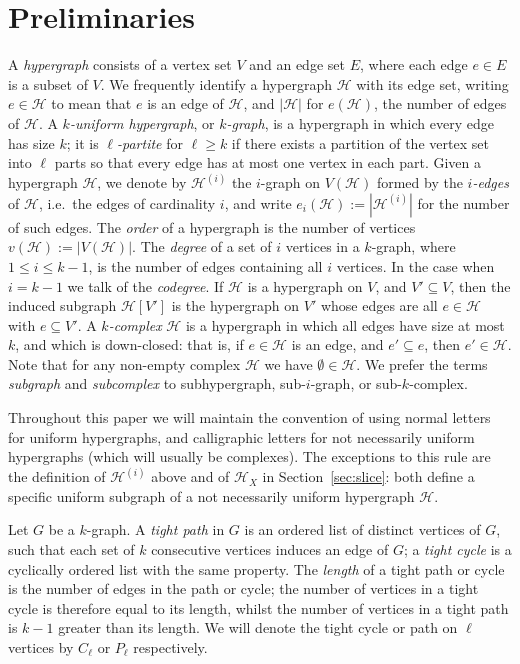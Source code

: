 \documentclass[12pt,a4paper]{amsart}
\let\subset\subseteq
\newcommand{\Hy}{\mathcal{H}}
\begin{document}

\section{Preliminaries}

A \emph{hypergraph} consists of a vertex set $V$ and an edge set $E$, where each edge $e \in E$ is a subset of $V$.  We frequently identify a hypergraph $\Hy$ with
its edge set, writing $e \in \Hy$ to mean that $e$ is an edge of $\Hy$, and
$|\Hy|$ for $e(\Hy)$, the number of edges of $\Hy$.
A \emph{$k$-uniform hypergraph}, or \emph{$k$-graph}, is a hypergraph in which every edge has
size $k$; it is \emph{$\ell$-partite} for $\ell \ge k$ if there exists a partition of the vertex set into $\ell$ parts so that every edge has at most one vertex in each part.
Given a hypergraph $\Hy$, we denote by $\Hy^{(i)}$ the $i$-graph on
$V(\Hy)$ formed by the \emph{$i$-edges} of $\Hy$, i.e.~the edges of cardinality $i$, and write $e_i(\Hy) := |\Hy^{(i)}|$ for the number of such edges. The \emph{order} of a hypergraph is the
number of vertices $v(\Hy) := |V(\Hy)|$. The \emph{degree} of a set of $i$ vertices in a $k$-graph, where $1\le i \le k-1$, is the number of edges containing all $i$ vertices. In the case when $i=k-1$ we talk of the \emph{codegree}. If $\Hy$ is a hypergraph on $V$, and $V'
\subseteq V$, then the induced subgraph $\Hy[V']$ is the hypergraph on $V'$ whose 
edges are all $e \in \Hy$ with $e \subseteq V'$. A \emph{$k$-complex} $\Hy$ is a hypergraph in which all edges have size at most $k$,
and which is down-closed: that is, if $e \in \Hy$ is an edge, and $e' \subset e$,
then $e' \in \Hy$. Note that for any non-empty complex $\Hy$ we have $\emptyset \in \Hy$. We prefer the terms \emph{subgraph} and \emph{subcomplex} to subhypergraph, sub-$i$-graph, or sub-$k$-complex.

Throughout this paper we will maintain the convention of using normal
letters for uniform hypergraphs, and calligraphic letters for not necessarily uniform
hypergraphs (which will usually be complexes). The exceptions to this rule are the definition of $\Hy^{(i)}$ above and of $\Hy_X$ in Section~\ref{sec:slice}: both define a specific uniform subgraph of a not necessarily uniform hypergraph $\Hy$.
 
Let $G$ be a $k$-graph. A
\emph{tight path} in $G$ is an ordered list of distinct vertices of $G$, such that
each set of $k$ consecutive vertices induces an edge of $G$; a \emph{tight cycle} is
a cyclically ordered list with the same property. The \emph{length} of a tight path or cycle is the number of edges in the path or cycle; the number of vertices in a tight cycle is therefore equal to its length, whilst the number of vertices in a tight path is $k-1$ greater than its length. We will denote the tight cycle or path on $\ell$ vertices by $C_\ell$ or $P_\ell$ respectively.
\end{document}
